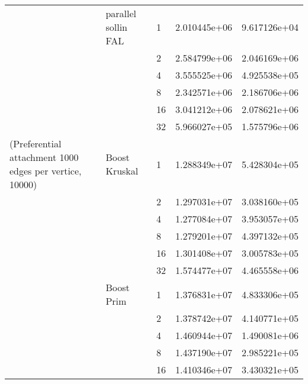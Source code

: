 \begin{tabular}{lllrr}
                                                       & parallel sollin FAL & 1  &  2.010445e+06 &  9.617126e+04 \\
                                                       &                     & 2  &  2.584799e+06 &  2.046169e+06 \\
                                                       &                     & 4  &  3.555525e+06 &  4.925538e+05 \\
                                                       &                     & 8  &  2.342571e+06 &  2.186706e+06 \\
                                                       &                     & 16 &  3.041212e+06 &  2.078621e+06 \\
                                                       &                     & 32 &  5.966027e+05 &  1.575796e+06 \\
(Preferential attachment 1000 edges per vertice, 10000) & Boost Kruskal & 1  &  1.288349e+07 &  5.428304e+05 \\
                                                       &                     & 2  &  1.297031e+07 &  3.038160e+05 \\
                                                       &                     & 4  &  1.277084e+07 &  3.953057e+05 \\
                                                       &                     & 8  &  1.279201e+07 &  4.397132e+05 \\
                                                       &                     & 16 &  1.301408e+07 &  3.005783e+05 \\
                                                       &                     & 32 &  1.574477e+07 &  4.465558e+06 \\
                                                       & Boost Prim & 1  &  1.376831e+07 &  4.833306e+05 \\
                                                       &                     & 2  &  1.378742e+07 &  4.140771e+05 \\
                                                       &                     & 4  &  1.460944e+07 &  1.490081e+06 \\
                                                       &                     & 8  &  1.437190e+07 &  2.985221e+05 \\
                                                       &                     & 16 &  1.410346e+07 &  3.430321e+05 \\

\end{tabular}

